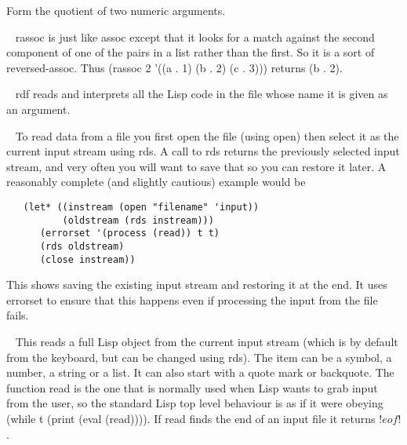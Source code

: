 \begin{description}
Form the quotient of two numeric arguments.
\item[{\tx rassoc~~~~~~~} \hspace{1cm} {\em function 2 args}]~\newline
{\tx rassoc} is just like {\tx assoc} except that it looks for a match
against the second component of one of the pairs in a list rather than
the first. So it is a sort of reversed-{\tx assoc}. Thus
{\tx (rassoc 2 '((a . 1) (b . 2) (c . 3)))} returns {\tx (b . 2)}.
\item[{\tx rdf~~~~~~~~~~} \hspace{1cm} {\em function 1 arg}]~\newline
{\tx rdf} reads and interprets all the Lisp code in the file whose name
it is given as an argument.
\item[{\tx rds~~~~~~~~~~} \hspace{1cm} {\em function 1 arg}]~\newline
To read data from a file you first open the file (using {\tx open}) then select
it as the current input stream using {\tx rds}. A call to {\tx rds} returns the
previously selected input stream, and very often you will want to save that
so you can restore it later. A reasonably complete (and slightly cautious)
example would be
{\small\begin{verbatim}
   (let* ((instream (open "filename" 'input))
          (oldstream (rds instream)))
      (errorset '(process (read)) t t)
      (rds oldstream)
      (close instream))
\end{verbatim}}
This shows saving the existing input stream and restoring it at the
end. It
uses {\tx errorset} to ensure that this happens even if processing the
input from the file fails.
\item[{\tx read~~~~~~~~~} \hspace{1cm} {\em function 0 args}]~\newline
This reads a full Lisp object from the current input stream (which is by
default from the keyboard, but can be changed using {\tx rds}). The item can
be a symbol, a number, a string or a list. It can also start with a quote
mark or backquote. The function {\tx read} is the one that is normally
used when Lisp wants to grab input from the user, so the standard
Lisp top level behaviour is as if it were obeying
{\tx (while t (print (eval (read))))}.
If {\tx read} finds the end of an input file it returns {\tx !$eof!$}.
\item[{\tx readch~~~~~~~} \hspace{1cm} {\em function 0 args}]~\newline

\end{description}
